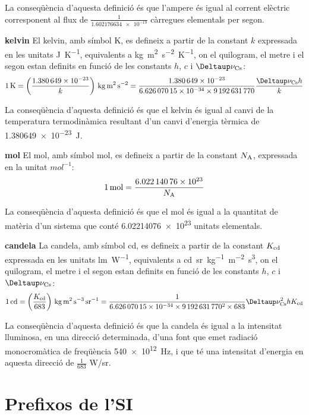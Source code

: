 \begin{list}{}
    La conseqüència d'aquesta definició és que l'ampere és igual al corrent elèctric corresponent al flux de $\frac{1}{\num{1,602176634 e-19}}$  càrregues elementals per segon.

   \item[\textbf{kelvin}]  El kelvin, amb símbol K, es defineix a partir de la constant $k$ expressada en les unitats \unit{J.K^{-1}},  equivalents a \unit{kg.m^2.s^{-2}.K^{-1}},  on el quilogram, el metre i el segon estan definits en funció de les constants $h$, $c$ i $\Deltaup\nu\ped{Cs}$:
       \[
            \qty{1}{K} = \left(\frac{\num{1,380649e-23}}{k}\right)\unit{\,kg.m^2.s^{-2}} = \frac{\num{1,380649e-23}}{\num{6,62607015 e-34}\times\num{9192631770}} \frac{\Deltaup\nu\ped{Cs} h}{k}
       \]

    La conseqüència d'aquesta definició és que el kelvin és igual al canvi de la temperatura termodinàmica resultant d'un canvi d'energia tèrmica de \qty{1,380649e-23}{J}.

   \item[\textbf{mol}]  El mol, amb símbol mol, es defineix a partir de la constant $N_\mathrm{A}$, expressada en la unitat  $\unit{mol^{-1}}$:
       \[
            \qty{1}{mol} = \frac{\num{6,02214076 e23}}{N_\mathrm{A}}
       \]

    La conseqüència d'aquesta definició és que el mol és igual a la quantitat de matèria d'un sistema que conté
    \num{6,02214076 e23} unitats elementals.

   \item[\textbf{candela}] La candela, amb símbol cd, es defineix a partir de la constant $K_\mathrm{cd}$ expressada en les unitats \unit{lm.W^{-1}},  equivalents a \unit{cd.sr.kg^{-1}.m^{-2}.s^3},  on el quilogram, el metre i el segon estan definits en funció de les constants $h$, $c$ i $\Deltaup\nu\ped{Cs}$:
       \[
            \qty{1}{cd} = \left(\frac{K\ped{cd}}{683}\right)\unit{\,kg.m^2.s^{-3}.sr^{-1}} = \frac{1}{\num{6,62607015 e-34}\times\num{9192631770}^2\times 683} \Deltaup\nu\ped{Cs}^2 h K\ped{cd}
       \]

    La conseqüència d'aquesta definició és que la candela és igual a la intensitat lluminosa, en una direcció determinada,   d'una font que emet radiació monocromàtica de freqüència \qty{540e12}{Hz}, i
   que té una intensitat d'energia en aquesta direcció de $\frac{1}{683}$ \unit{W/sr}.
\end{list}


\section{Prefixos de l'SI}

